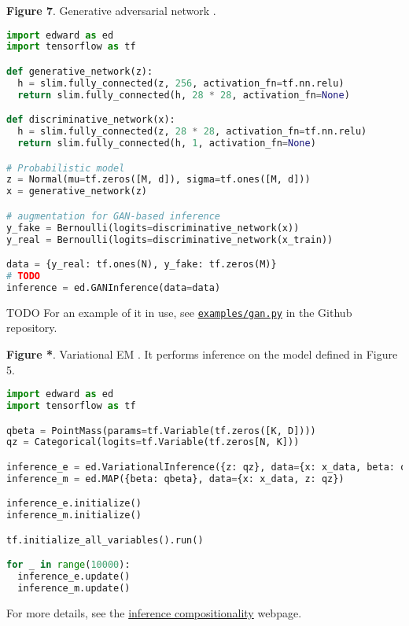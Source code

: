 \textbf{Figure 7}. Generative adversarial network
\citep{goodfellow2014generative}.
\begin{lstlisting}[language=python]
import edward as ed
import tensorflow as tf

def generative_network(z):
  h = slim.fully_connected(z, 256, activation_fn=tf.nn.relu)
  return slim.fully_connected(h, 28 * 28, activation_fn=None)

def discriminative_network(x):
  h = slim.fully_connected(z, 28 * 28, activation_fn=tf.nn.relu)
  return slim.fully_connected(h, 1, activation_fn=None)

# Probabilistic model
z = Normal(mu=tf.zeros([M, d]), sigma=tf.ones([M, d]))
x = generative_network(z)

# augmentation for GAN-based inference
y_fake = Bernoulli(logits=discriminative_network(x))
y_real = Bernoulli(logits=discriminative_network(x_train))

data = {y_real: tf.ones(N), y_fake: tf.zeros(M)}
# TODO
inference = ed.GANInference(data=data)
\end{lstlisting}
TODO
For an example of it in use, see
\href{https://github.com/blei-lab/edward/blob/master/examples/gan.py}{\texttt{examples/gan.py}}
in the Github repository.

\textbf{Figure *}. Variational EM \citep{neal1993new}.
It performs inference on the model defined in Figure 5.
\begin{lstlisting}[language=python]
import edward as ed
import tensorflow as tf

qbeta = PointMass(params=tf.Variable(tf.zeros([K, D])))
qz = Categorical(logits=tf.Variable(tf.zeros[N, K]))

inference_e = ed.VariationalInference({z: qz}, data={x: x_data, beta: qbeta})
inference_m = ed.MAP({beta: qbeta}, data={x: x_data, z: qz})

inference_e.initialize()
inference_m.initialize()

tf.initialize_all_variables().run()

for _ in range(10000):
  inference_e.update()
  inference_m.update()
\end{lstlisting}
For more details, see the
\href{/api/inference-compositionality}{inference compositionality} webpage.

